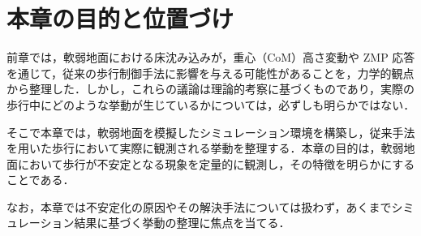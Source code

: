 \section{本章の目的と位置づけ}
\label{sec:sim_purpose}

前章では，軟弱地面における床沈み込みが，重心（CoM）高さ変動や ZMP 応答を通じて，従来の歩行制御手法に影響を与える可能性があることを，力学的観点から整理した．しかし，これらの議論は理論的考察に基づくものであり，実際の歩行中にどのような挙動が生じているかについては，必ずしも明らかではない．

そこで本章では，軟弱地面を模擬したシミュレーション環境を構築し，従来手法を用いた歩行において実際に観測される挙動を整理する．本章の目的は，軟弱地面において歩行が不安定となる現象を定量的に観測し，その特徴を明らかにすることである．

なお，本章では不安定化の原因やその解決手法については扱わず，あくまでシミュレーション結果に基づく挙動の整理に焦点を当てる．
